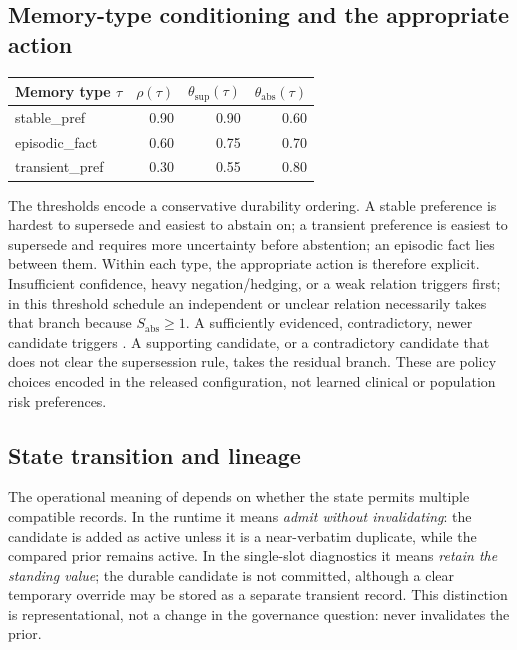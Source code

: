\subsection{Memory-type conditioning and the appropriate action}
\label{sec:typeconditioning}

\begin{center}
\small
\begin{tabular}{@{}lrrr@{}}
\toprule
Memory type $\tau$ & $\rho(\tau)$ &
$\theta_{\mathrm{sup}}(\tau)$ & $\theta_{\mathrm{abs}}(\tau)$ \\
\midrule
\textsf{stable\_pref}    & 0.90 & 0.90 & 0.60 \\
\textsf{episodic\_fact}  & 0.60 & 0.75 & 0.70 \\
\textsf{transient\_pref} & 0.30 & 0.55 & 0.80 \\
\bottomrule
\end{tabular}
\end{center}

The thresholds encode a conservative durability ordering. A stable preference
is hardest to supersede and easiest to abstain on; a transient preference is
easiest to supersede and requires more uncertainty before abstention; an
episodic fact lies between them. Within each type, the appropriate action is
therefore explicit. Insufficient confidence, heavy negation/hedging, or a weak
relation triggers \abstain{} first; in this threshold schedule an independent
or unclear relation necessarily takes that branch because
$S_{\mathrm{abs}}\geq 1$. A sufficiently evidenced, contradictory, newer
candidate triggers \supersede{}. A supporting candidate, or a contradictory
candidate that does not clear the supersession rule, takes the residual
\keep{} branch. These are policy choices encoded in the released
configuration, not learned clinical or population risk preferences.

\subsection{State transition and lineage}

The operational meaning of \keep{} depends on whether the state permits
multiple compatible records. In the \lme{} runtime it means
\emph{admit without invalidating}: the candidate is added as active unless it
is a near-verbatim duplicate, while the compared prior remains active. In the
single-slot \mgp{} diagnostics it means \emph{retain the standing value}; the
durable candidate is not committed, although a clear temporary override may be
stored as a separate transient record. This distinction is representational,
not a change in the governance question: \keep{} never invalidates the prior.


